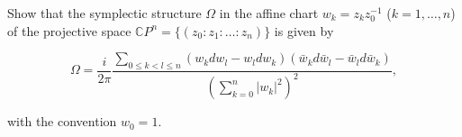 Show that the symplectic structure $\Omega$ in the affine chart $w_k = z_k z_0^{-1}$ ($k = 1, \ldots, n$) of the projective space $\mathbb{C}P^n = \{(z_0 : z_1 : \ldots : z_n)\}$ is given by

$$\Omega = \frac{i}{2\pi} \frac{\sum_{0 \leq k < l \leq n} (w_k dw_l - w_l dw_k) (\bar{w}_k d\bar{w}_l - \bar{w}_l d\bar{w}_k)}{\left(\sum_{k=0}^{n} |w_k|^2\right)^2},$$

with the convention $w_0 = 1$.
